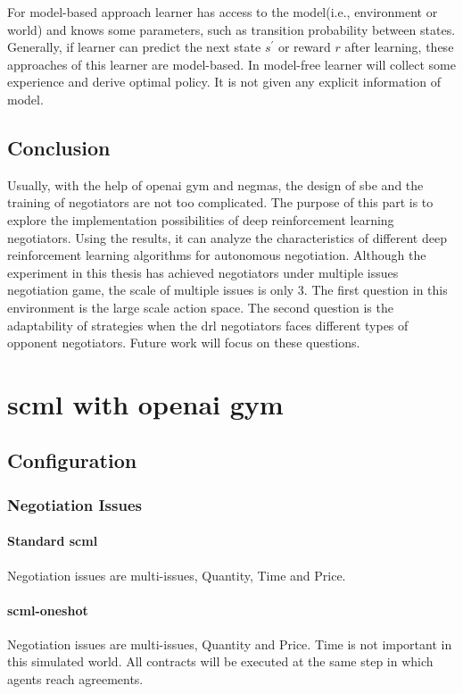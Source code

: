 For model-based approach learner has access to the model(i.e., environment or world) and knows some parameters, such as transition probability between states. Generally, if learner can predict the next state $s^{\prime}$ or reward $r$ after learning, these approaches of this learner are model-based. In model-free learner will collect some experience and derive optimal policy. It is not given any explicit information of model.

\subsection{Conclusion}
Usually, with the help of \gls{openai gym} and \gls{negmas}, the design of \gls{sbe} and the training of negotiators are not too complicated. The purpose of this part is to explore the implementation possibilities of deep reinforcement learning negotiators. Using the results, it can analyze the characteristics of different deep reinforcement learning algorithms for autonomous negotiation. Although the experiment in this thesis has achieved negotiators under multiple issues negotiation game, the scale of multiple issues is only 3. The first question in this environment is the large scale action space. The second question is the adaptability of strategies when the \gls{drl} negotiators faces different types of opponent negotiators. Future work will focus on these questions. 

\section{\gls{scml} with \gls{openai gym}}
\subsection{Configuration}
\subsubsection{Negotiation Issues}
\paragraph{Standard \gls{scml}} Negotiation issues are multi-issues, Quantity, Time and Price. 
\paragraph{\gls{scml-oneshot}} Negotiation issues are multi-issues, Quantity and Price. Time is not important in this simulated world. All contracts will be executed at the same step in which agents reach agreements.

